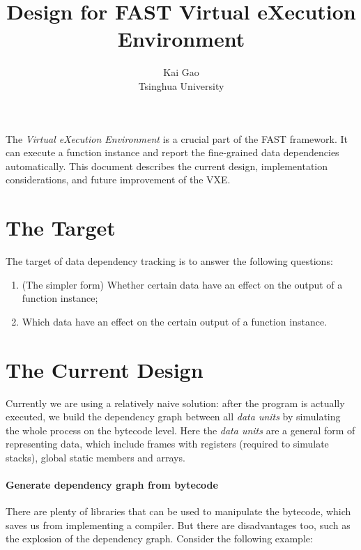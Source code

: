\documentclass[10pt]{article}
\newcommand\VXE{\emph{Virtual eXecution Environment}\xspace}
\newcommand\challenge[1]{{\color{red} #1}}
\begin{document}
\title{Design for FAST Virtual eXecution Environment}
\author{Kai Gao\\Tsinghua University}
\date{}
\maketitle

The \VXE is a crucial part of the FAST framework.  It can execute a function
instance and report the fine-grained data dependencies automatically.  This
document describes the current design, implementation considerations, and future
improvement of the VXE.

\section{The Target}

The target of data dependency tracking is to answer the following questions:

\begin{enumerate}
	\item (The simpler form) Whether certain data have an effect on the output
		of a function instance;
	\item Which data have an effect on the certain output of a function
		instance.
\end{enumerate}


\section{The Current Design}

Currently we are using a relatively naive solution: after the program is
actually executed, we build the dependency graph between all \emph{data units}
by simulating the whole process on the bytecode level.  Here the \emph{data
units} are a general form of representing data, which include frames with
registers (required to simulate stacks), global static members and arrays.

\paragraph{Generate dependency graph from bytecode}\hfill

There are plenty of libraries that can be used to manipulate the bytecode, which
saves us from implementing a compiler.  But there are disadvantages too, such as
\challenge{the explosion of the dependency graph}. Consider the following example:
\end{document}
